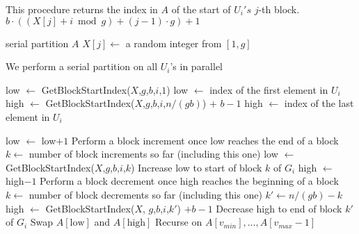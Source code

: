 \documentclass[sigplan, 10pt, nonacm]{acmart}
\theoremstyle{remark}
\theoremstyle{remark}
\begin{document}
\begin{appendices}
\begin{figure*}
\begin{algorithmic}
      \Comment This procedure returns the index in $A$ of the start of $U_i's$ $j$-th block.
      \State\Return $b\cdot ((X[j] + i \bmod g) +(j-1)\cdot g)+1$
    \EndProcedure
    \State

        \State serial partition $A$
      \Else
          \State $X[j] \gets$ a random integer from $[1,g]$ 
        \EndFor

         \Comment We perform a serial partition on all $U_i$'s in parallel

          \State low $\gets$ GetBlockStartIndex($X$,$g$,$b$,$i$,$1$)
          \Comment low $\gets$ index of the first element in $U_i$
          \State high $\gets$ GetBlockStartIndex($X$,$g$,$b$,$i$,$n/(gb)$) + $b-1$
          \Comment high $\gets$ index of the last element in $U_i$

              \State low $\gets$ low$+1$
                \Comment Perform a block increment once low reaches the end of a block
                \State $k \gets $ number of block increments so far (including this one)
                \State low $\gets$ GetBlockStartIndex($X$,$g$,$b$,$i$,$k$)
                \Comment Increase low to start of block $k$ of $G_i$
              \EndIf
            \EndWhile
              \State high $\gets$ high$-1$
                \Comment Perform a block decrement once high reaches the beginning of a block
                \State $k \gets $ number of block decrements so far (including this one)
                \State $k' \gets n/(gb) - k$
                \State high $\gets$ GetBlockStartIndex($X$, $g$,$b$,$i$,$k'$) $+b-1$
                \Comment Decrease high to end of block $k'$ of $G_i$
              \EndIf
            \EndWhile
            \State Swap $A[\text{low}]$ and $A[\text{high}]$
          \EndWhile
        \EndFor
        \State Recurse on $A[v_{min}],\ldots,A[v_{max}-1]$
      \EndIf
    \EndProcedure
	\end{algorithmic}	
\end{figure*}


\end{appendices}
\end{document}
